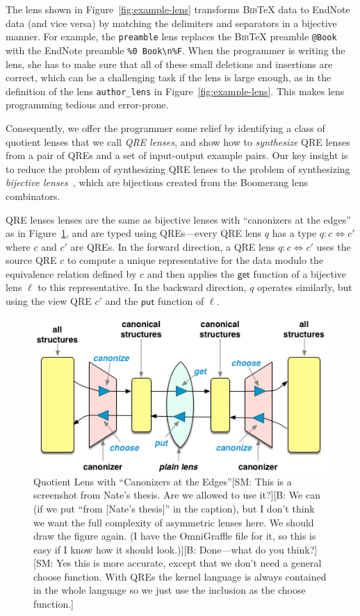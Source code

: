 \documentclass[acmsmall,review,anonymous]{acmart}\settopmatter{printfolios=true,printccs=false,printacmref=false}
\newcommand{\FINISH}[3]{\ifdraft\textcolor{#1}{[#2: #3]}\fi}
\newcommand{\bcp}[1]{\FINISH{dkred}{B}{#1}}
\newcommand{\sam}[1]{\FINISH{dkpurple}{SM}{#1}}
\newcommand{\kw}[1]{\ensuremath{\mathsf{#1}}}
\newcommand{\bibtex}{\textsc{Bib}\TeX{}}
\newcommand{\get}{\ensuremath{\kw{get}}}
\newcommand{\lput}{\ensuremath{\kw{put}}}
\newcommand{\cd}[1]{\lstinline[backgroundcolor=\color{white}]$#1$}
\begin{document}
The lens shown in Figure~\ref{fig:example-lens} transforms \bibtex{} data to
EndNote data  (and vice versa) by matching the delimiters and separators in a
bijective manner. For example, the \cd{preamble} lens replaces the \bibtex{}
preamble \verb|@Book| with the EndNote preamble \verb|%0 Book\n%F|. When the
programmer is writing the lens, she has to make sure that all of these small
deletions and insertions are correct, which can be a challenging task if the
lens is large enough, as in the definition of the lens \verb!author_lens! in
Figure~\ref{fig:example-lens}. This makes lens programming tedious and
error-prone.

Consequently, we offer the programmer some relief by identifying a class of
quotient lenses that we call {\em QRE lenses}, and show how to {\em synthesize}
QRE lenses from a pair of QREs and a set of input-output example pairs. Our key
insight is to reduce the problem of synthesizing QRE lenses to the problem of
synthesizing {\em bijective lenses}~\cite{optician}, which are bijections created
from the Boomerang lens combinators.

QRE lenses lenses are the same as bijective lenses with ``canonizers at the
edges'' as in Figure~\ref{fig:attheedges}, and are typed using QREs---every QRE
lens $q$ has a type $q: c \Leftrightarrow c'$ where $c$ and $c'$ are QREs.
In the forward direction, a QRE lens $q: c \Leftrightarrow c'$ uses the source
QRE $c$ to compute a unique representative for the data modulo the equivalence
relation defined by $c$ and then applies the $\get$ function of a bijective
lens $\ell$ to this representative. In the backward direction, $q$ operates
similarly,  but using the view QRE $c'$ and the $\lput$ function of $\ell$.

\begin{figure}[t]
\centering
\includegraphics[width=\textwidth]{canonizers-outside}
\caption{Quotient Lens with ``Canonizers at the Edges''\sam{This is a
screenshot from Nate's thesis. Are we allowed to use it?}\bcp{We can
(if we put ``from [Nate's thesis]'' in the caption), but I don't think
we want the full complexity of asymmetric lenses here.  We should draw
the figure again.  (I have the OmniGraffle file for it, so this is
easy if I know how it should look.)}\bcp{Done---what do you think?}
\sam{Yes this is more accurate, except that we don't need a general choose
function. With QREs the kernel language is always contained in the whole
language so we just use the inclusion as the choose function.}}
\label{fig:attheedges}
\end{figure}
\end{document}
